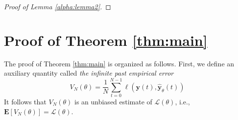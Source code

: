 \documentclass{article}
\def\rvy{{\mathbf{y}}}
\newcommand{\e}{\mathbf{e}}
\newcommand{\y}{\mathbf{y}}
\newcommand{\bE}{\mathbf{E}}
\begin{document}
\begin{proof}[Proof of Lemma  \ref{alpha:lemma2}]
\end{proof}





\section{Proof of Theorem \ref{thm:main}}
\label{sect:pf:thm_main}
  The proof of Theorem \ref{thm:main} is organized as follows. 
  First, we define an auxiliary quantity called \emph{the infinite past empirical error}
\[ V_N(\theta)=%
\frac{1}{N}\sum_{t=0}^{N-1}\ell(\rvy(t),\hat{\rvy}_\theta(t)) \]
It follows that $V_N(\theta)$ is an unbiased estimate of $\mathcal{L}(\theta)$, i.e., $\bE[V_N(\theta)]=\mathcal{L}(\theta)$.
\end{document}
